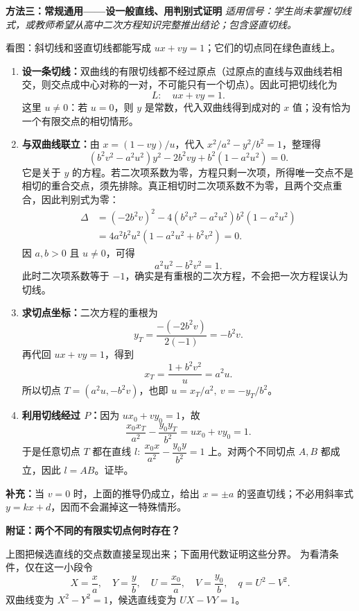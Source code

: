 \begin{proofbox}
\medskip
\begin{minipage}{\linewidth}
\textbf{\textcolor{CProof}{方法三：常规通用——设一般直线、用判别式证明}}
\textit{适用信号：学生尚未掌握切线式，或教师希望从高中二次方程知识完整推出结论；包含竖直切线。}
\begin{center}

\end{center}
看图：斜切线和竖直切线都能写成 $ux+vy=1$；它们的切点同在绿色直线上。

\end{minipage}
\begin{enumerate}[leftmargin=*,itemsep=0.42em]
\item \textbf{设一条切线：}双曲线的有限切线都不经过原点（过原点的直线与双曲线若相交，则交点成中心对称的一对，不可能只有一个切点）。因此可把切线化为
\[L:\quad ux+vy=1.\]
这里 $u\ne0$：若 $u=0$，则 $y$ 是常数，代入双曲线得到成对的 $x$ 值；没有恰为一个有限交点的相切情形。
\item \textbf{与双曲线联立：}由 $x=(1-vy)/u$，代入 $x^2/a^2-y^2/b^2=1$，整理得
\[
(b^2v^2-a^2u^2)y^2-2b^2vy+b^2(1-a^2u^2)=0.
\]
它是关于 $y$ 的方程。若二次项系数为零，方程只剩一次项，所得唯一交点不是相切的重合交点，须先排除。真正相切时二次项系数不为零，且两个交点重合，因此判别式为零：
\[
\begin{aligned}
\Delta&=(-2b^2v)^2-4(b^2v^2-a^2u^2)b^2(1-a^2u^2)\\
&=4a^2b^2u^2(1-a^2u^2+b^2v^2)=0.
\end{aligned}
\]
因 $a,b>0$ 且 $u\ne0$，可得
\[\boxed{a^2u^2-b^2v^2=1}.\]
此时二次项系数等于 $-1$，确实是有重根的二次方程，不会把一次方程误认为切线。
\item \textbf{求切点坐标：}二次方程的重根为
\[y_T=\frac{-(-2b^2v)}{2(-1)}=-b^2v.\]
再代回 $ux+vy=1$，得到
\[x_T=\frac{1+b^2v^2}{u}=a^2u.\]
所以切点 $T=(a^2u,-b^2v)$，也即 $u=x_T/a^2,\ v=-y_T/b^2$。
\item \textbf{利用切线经过 $P$：}因为 $ux_0+vy_0=1$，故
\[
\frac{x_0x_T}{a^2}-\frac{y_0y_T}{b^2}=ux_0+vy_0=1.
\]
于是任意切点 $T$ 都在直线 $l:\ \dfrac{x_0x}{a^2}-\dfrac{y_0y}{b^2}=1$ 上。对两个不同切点 $A,B$ 都成立，因此 $l=AB$。证毕。
\end{enumerate}
\textbf{补充：}当 $v=0$ 时，上面的推导仍成立，给出 $x=\pm a$ 的竖直切线；不必用斜率式 $y=kx+d$，因而不会漏掉这一特殊情形。

\medskip
\begin{minipage}{\linewidth}
\textbf{\textcolor{CProof}{附证：两个不同的有限实切点何时存在？}}
\begin{center}

\end{center}
\end{minipage}
上图把候选直线的交点数直接呈现出来；下面用代数证明这些分界。
为看清条件，仅在这一小段令
\[
X=\frac{x}{a},\quad Y=\frac{y}{b},\quad U=\frac{x_0}{a},\quad V=\frac{y_0}{b},\quad q=U^2-V^2.
\]
双曲线变为 $X^2-Y^2=1$，候选直线变为 $UX-VY=1$。


\end{proofbox}
